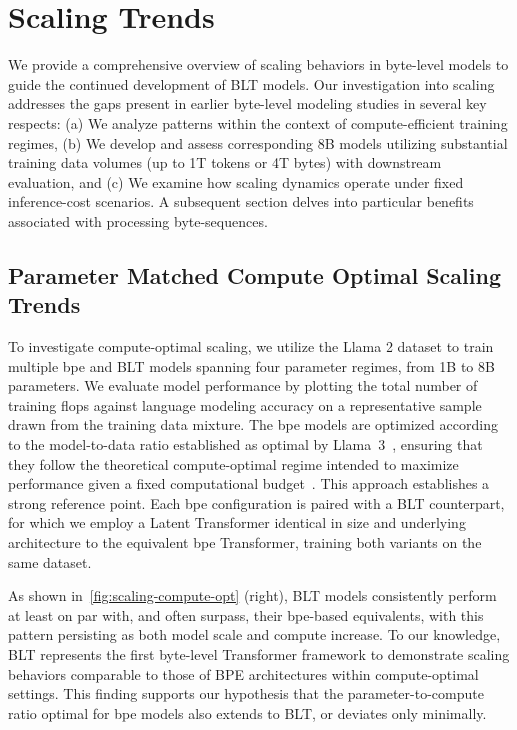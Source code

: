 \section{Scaling Trends}
\label{section:scaling}

We provide a comprehensive overview of scaling behaviors in byte-level models to guide the continued development of {\textsc BLT} models. Our investigation into scaling addresses the gaps present in earlier byte-level modeling studies in several key respects: (a) We analyze patterns within the context of compute-efficient training regimes, (b) We develop and assess corresponding 8B models utilizing substantial training data volumes (up to 1T tokens or 4T bytes) with downstream evaluation, and (c) We examine how scaling dynamics operate under fixed inference-cost scenarios. A subsequent section delves into particular benefits associated with processing byte-sequences.

\subsection{Parameter Matched Compute Optimal Scaling Trends}
\label{section:parameter-matched-scaling}
To investigate compute-optimal scaling, we utilize the Llama 2 dataset to train multiple bpe and {\textsc BLT} models spanning four parameter regimes, from 1B to 8B parameters. We evaluate model performance by plotting the total number of training flops against language modeling accuracy on a representative sample drawn from the training data mixture. The bpe models are optimized according to the model-to-data ratio established as optimal by Llama~3~\citep{dubey2024llama}, ensuring that they follow the theoretical compute-optimal regime intended to maximize performance given a fixed computational budget~\citep{hoffmann2022training}. This approach establishes a strong reference point. Each bpe configuration is paired with a {\textsc BLT} counterpart, for which we employ a Latent Transformer identical in size and underlying architecture to the equivalent bpe Transformer, training both variants on the same dataset.

As shown in~\autoref{fig:scaling-compute-opt} (right), {\textsc BLT} models consistently perform at least on par with, and often surpass, their bpe-based equivalents, with this pattern persisting as both model scale and compute increase. To our knowledge, {\textsc BLT} represents the first byte-level Transformer framework to demonstrate scaling behaviors comparable to those of BPE architectures within compute-optimal settings. This finding supports our hypothesis that the parameter-to-compute ratio optimal for bpe models also extends to {\textsc BLT}, or deviates only minimally.

